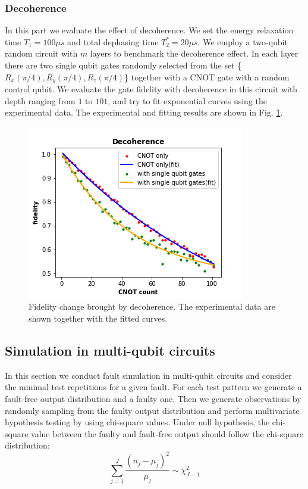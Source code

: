 \documentclass[conference, 9pt]{IEEEtran}
\begin{document}
\subsubsection{Decoherence}
In this part we evaluate the effect of decoherence. We set the energy relaxation time $T_1 = 100\mu s$ and total dephasing time $T_{2}^{*} = 20\mu s$. We employ a two-qubit random circuit with $m$ layers to benchmark the decoherence effect. In each layer there are two single qubit gates randomly selected from the set  \{$R_x(\pi/4),R_y(\pi/4),R_z(\pi/4)$\} together with a CNOT gate with a random control qubit. We evaluate the gate fidelity with decoherence in this circuit with depth ranging from $1$ to $101$, and try to fit exponential curves using the experimental data. The experimental and fitting results are shown in Fig. \ref{fig:decoherence}.
\begin{figure}
    \centering
    \includegraphics[width = .80\linewidth]{Figures/decoherence2.png}
    \caption{Fidelity change brought by decoherence. The experimental data are shown together with the fitted curves.}
    \label{fig:decoherence}
\end{figure}

\subsection{Simulation in multi-qubit circuits}
In this section we conduct fault simulation in multi-qubit circuits and consider the minimal test repetitions for a given fault. For each test pattern we generate a fault-free output distribution and a faulty one. Then we generate observations by randomly sampling from the faulty output distribution and perform multivariate hypothesis testing by using chi-square values. Under null hypothesis, the chi-square value between the faulty and fault-free output should follow the chi-square distribution:
\begin{equation}
    \sum_{j = 1}^{J}\frac{(n_j - \mu_j)^2}{\mu_j} \sim \chi_{J-1}^2
\end{equation}
\end{document}
